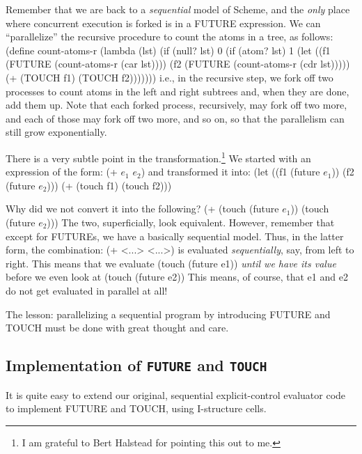 Remember that we are back to a {\em sequential\/} model of Scheme, and the {\em
only\/} place where concurrent execution is forked is in a {\cf FUTURE}
expression.  We can ``parallelize'' the recursive procedure to count
the atoms in a tree, as follows:
\beginlisp
(define count-atoms-r (lambda (lst)
    (if (null? lst)
        0
        (if (atom? lst)
            1
            (let
                  ((f1 (FUTURE (count-atoms-r (car lst))))
                   (f2 (FUTURE (count-atoms-r (cdr lst)))))
              (+ (TOUCH f1) (TOUCH f2)))))))
\endlisp
 i.e., in the recursive step, we fork off two processes to count atoms in
the left and right subtrees and, when they are done, add them up.  Note that
each forked process, recursively, may fork off two more, and each of
those may fork off two more, and so on, so that the parallelism can still
grow exponentially. 

There is a very subtle point in the transformation.\footnote{
 I am grateful to Bert Halstead for pointing this out to me.
}
 We started with an
expression of the form:
\beginlisp
(+ $e_1$ $e_2$)
\endlisp
and transformed it into:
\beginlisp
(let
      ((f1 (future $e_1$))
       (f2 (future $e_2$)))
  (+ (touch f1) (touch f2)))

\endlisp
Why did we not convert it into the following?
\beginlisp
(+ (touch (future $e_1$)) (touch (future $e_2$)))
\endlisp
The two, superficially, look equivalent.  However, remember that except for
{\cf FUTUREs}, we have a basically sequential model.  Thus, in the latter
form, the combination:
\beginlisp
(+ <...> <...>)
\endlisp
is evaluated {\em sequentially\/}, say, from left to right.  This means that
we evaluate
\beginlisp
(touch (future e1))
\endlisp
{\em until we have its value\/} before we even look at
\beginlisp
(touch (future e2))
\endlisp
This means, of course, that {\cf e1} and {\cf e2} do not get evaluated in
parallel at all!

The lesson:  parallelizing a sequential program by introducing {\cf FUTURE} and
{\cf TOUCH} must be done with great thought and care.

\subsection{Implementation of {\tt FUTURE} and {\tt TOUCH}}

It is quite easy to extend our original, sequential explicit-control
evaluator code to implement {\cf FUTURE} and {\cf TOUCH}, using I-structure
cells.

